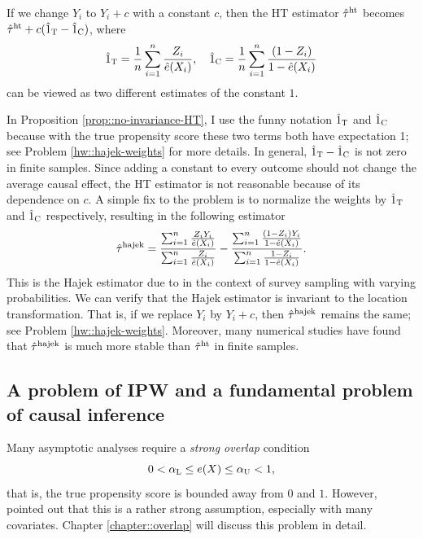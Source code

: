 \begin{proposition}
\label{prop::no-invariance-HT}
If we change $Y_i$ to $Y_i+c$ with a constant $c$, then the HT estimator $\hat{\tau}^\textup{ht}$ becomes $\hat{\tau}^\textup{ht} + c (\hat{ 1 }_\textsc{T} - \hat{ 1 }_\textsc{C})$, where 
$$
\hat{ 1 }_\textsc{T}=   \frac{1}{n} \sum_{i=1}^n \frac{Z_i }{ \hat{e}(X_i) } ,\quad
\hat{ 1 }_\textsc{C} =\frac{1}{n} \sum_{i=1}^n \frac{ (1-Z_i) }{ 1 - \hat{e}(X_i) }   
$$
can be viewed as two different estimates of the constant $1$. 
\end{proposition}

In Proposition \ref{prop::no-invariance-HT}, I use the funny notation $\hat{ 1 }_\textsc{T} $ and $ \hat{ 1 }_\textsc{C}$ because with the true propensity score these two terms both have expectation 1; see Problem \ref{hw::hajek-weights} for more details. 
In general, $\hat{ 1 }_\textsc{T} - \hat{ 1 }_\textsc{C}$ is not zero in finite samples. 
Since adding a constant to every outcome should not change the average causal effect, the HT estimator is not reasonable because of its dependence on $c.$ A simple fix to the problem is to normalize the weights by $\hat{ 1 }_\textsc{T}  $ and $\hat{ 1 }_\textsc{C} $ respectively, resulting in the following estimator 
$$
\hat{\tau}^\textup{hajek} = \frac{  \sum_{i=1}^n \frac{Z_i Y_i}{ \hat{e}(X_i) }  }{  \sum_{i=1}^n \frac{Z_i }{ \hat{e}(X_i) } }
- \frac{  \sum_{i=1}^n \frac{ (1-Z_i) Y_i}{ 1 - \hat{e}(X_i) }  }{  \sum_{i=1}^n \frac{ 1-Z_i}{ 1 - \hat{e}(X_i) }  }.
$$
This is the Hajek estimator due to \citet{hajek1971comment} in the context of survey sampling with varying probabilities. We can verify that the Hajek estimator is invariant to the location transformation. That is, if we replace $Y_i$ by $Y_i + c$, then $\hat{\tau}^\textup{hajek}$ remains the same; see Problem \ref{hw::hajek-weights}. Moreover, many numerical studies have found that $\hat{\tau}^\textup{hajek}$ is much more stable than $\hat{\tau}^\textup{ht}$ in finite samples. 





\subsection{A problem of IPW and a fundamental problem of causal inference}
\label{sec::ipw-problem}


Many asymptotic analyses require a {\it strong overlap} condition
$$
0<  \alpha_\textsc{L} \leq e(X) \leq  \alpha_\textsc{U} < 1,
$$
that is, the true propensity score is bounded away from $0$ and $1$. However, \citet{d2017overlap} pointed out that this is a rather strong assumption, especially with many covariates. Chapter \ref{chapter::overlap} will discuss this problem in detail. 


